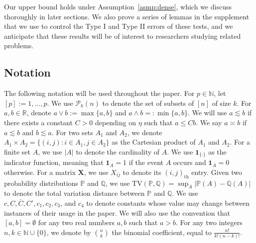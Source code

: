 \documentclass{article}
\newcommand{\R}{\mathbb{R}}
\newcommand{\bbP}{\mathbb{P}}
\newcommand{\one}{\mathbf{1}}
\begin{document}
\begin{enumerate}
\begin{enumerate}
     \end{enumerate} 
     Our upper bound holds under Assumption~\ref{asmp:dense}, which we discuss thoroughly in later sections. 
     We also prove a series of lemmas in the supplement that we use to control the Type I and Type II errors of these tests, and we anticipate that these results will be of interest to researchers studying related problems.
 \end{enumerate}
\subsection{Notation}\label{sec_notation}

The following notation will be used throughout the paper. For $p \in \mathbb N$, let $[p] := {1,...,p}$. We use $\mathcal P_k(n)$ to denote the set of subsets of $[n]$ of size $k$. For $a,b \in \R$,
denote $a \lor b:= \max\{a,b\}$ and $a \land b =: \min\{a,b\}$.  We will use $a \lesssim b$ if there exists a constant $C > 0$ depending on $\eta$ such that $a \leq C b$. We say $a \asymp b$ if $a \lesssim b$ and $b \lesssim a$. For two sets $A_1$ and $A_2$, we denote $A_1 \times A_2 = \{(i,j) : i \in A_1, j \in A_2\}$ as the Cartesian product of $A_1$ and $A_2$. For a finite set $A$, we use $|A|$ to denote the cardinality of $A$. We use $\one_{\{\cdot\}}$ as the indicator function, meaning that $\one_{A} = 1$ if the event $A$ occurs and $\one_{A} = 0$ otherwise. For a matrix $\mathbf X$, we use $X_{ij}$ to denote its $(i,j)_{\text{th}}$ entry. Given two probability distributions $\bbP$ and $\mathbb Q$, we use $\text{TV}(\bbP, \mathbb Q) = \sup_A|\bbP(A) - \mathbb Q(A)|$ to denote the total variation distance between $\bbP$ and $\mathbb Q$. We use $c, C, \bar{C}, C', c_1, c_2, c_3$, and $c_4$ to denote constants whose value may change between instances of their usage in the paper. 
We will also use the convention that $[a,b] = \emptyset$ for any two real numbers $a,b$ such that $a>b$. 
For any two integers $n,k \in \mathbb N\cup \{0\}$, we denote by ${n \choose k}$ the binomial coefficient, equal to $\frac{n!}{k! (n-k)!}$.
\end{document}
